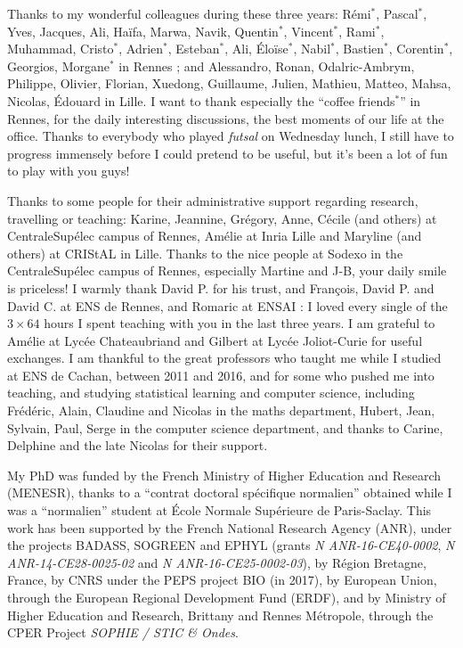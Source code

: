 \begin{acknowledgements}
Thanks to my wonderful colleagues during these three years: Rémi$^*$, Pascal$^*$, Yves, Jacques, Ali, Haïfa, Marwa, Navik, Quentin$^*$, Vincent$^*$, Rami$^*$, Muhammad, Cristo$^*$, Adrien$^*$, Esteban$^*$, Ali, Éloïse$^*$, Nabil$^*$, Bastien$^*$, Corentin$^*$, Georgios, Morgane$^*$ in Rennes ; and Alessandro, Ronan, Odalric-Ambrym, Philippe, Olivier, Florian, Xuedong, Guillaume, Julien, Mathieu, Matteo, Mahsa, Nicolas, Édouard in Lille.
I want to thank especially the ``coffee friends$^*$'' in Rennes, for the daily interesting discussions, the best moments of our life at the office.
%
Thanks to everybody who played \emph{futsal} on Wednesday lunch, I still have to progress immensely before I could pretend to be useful, but it's been a lot of fun to play with you guys!

Thanks to some people for their administrative support regarding research, travelling or teaching: Karine, Jeannine, Grégory, Anne, Cécile (and others) at CentraleSupélec campus of Rennes, Amélie at Inria Lille and Maryline (and others) at CRIStAL in Lille.
Thanks to the nice people at Sodexo in the CentraleSupélec campus of Rennes, especially Martine and J-B, your daily smile is priceless!
I warmly thank David P. for his trust, and François, David P. and David C. at ENS de Rennes, and Romaric at ENSAI : I loved every single of the $3 \times 64$ hours I spent teaching with you in the last three years.
I am grateful to Amélie at Lycée Chateaubriand and Gilbert at Lycée Joliot-Curie for useful exchanges.
%
I am thankful to the great professors who taught me while I studied at ENS de Cachan, between 2011 and 2016, and for some who pushed me into teaching, and studying statistical learning and computer science, including Frédéric, Alain, Claudine and Nicolas in the maths department, Hubert, Jean, Sylvain, Paul, Serge in the computer science department, and thanks to Carine, Delphine and the late Nicolas for their support.


My PhD was funded by the French Ministry of Higher Education and Research (MENESR),
thanks to a ``contrat doctoral spécifique normalien'' obtained while I was a ``normalien'' student at \'Ecole Normale Sup\'erieure de Paris-Saclay.
This work has been supported by
the French National Research Agency (ANR), under the projects BADASS, SOGREEN and EPHYL (grants \emph{N ANR-16-CE40-0002}, \emph{N ANR-14-CE28-0025-02} and \emph{N ANR-16-CE25-0002-03}),
by R\'egion Bretagne, France,
by CNRS under the PEPS project BIO (in 2017),
by European Union, through the European Regional Development Fund (ERDF),
and by Ministry of Higher Education and Research, Brittany and Rennes Métropole, through the CPER Project \emph{SOPHIE / STIC \& Ondes}.



\end{acknowledgements}
